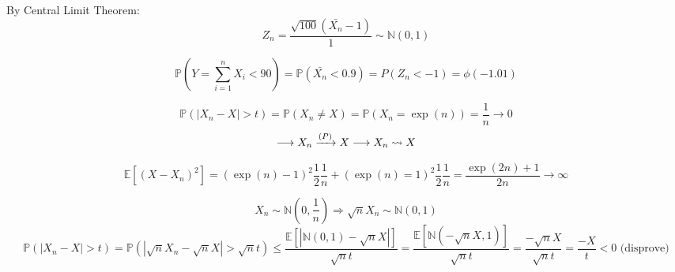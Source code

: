 \documentclass[10pt]{article}
\newenvironment{problem}[2][Problem]{\begin{trivlist}
\item[\hskip \labelsep {\bfseries #1}\hskip \labelsep {\bfseries #2.}]}{\end{trivlist}}
\begin{document}
\begin{problem}{8}



By Central Limit Theorem: 
\[Z_n=\frac{\sqrt{100}(\bar{X_n}-1)}{1} \sim \mathbb{N}(0,1)\]

\[\mathbb{P}(Y=\sum_{i=1}^{n} X_i < 90)= \mathbb{P}(\bar{X_n} < 0.9)= P(Z_n < -1)=\phi (-1.01)\]
\end{problem}




\begin{problem}{9}



\[\mathbb{P}(|X_n- X| > t)= \mathbb{P}(X_n \neq X)=\mathbb{P}(X_n=\exp(n))=\frac{1}{n} \longrightarrow 0\]
\[\longrightarrow X_n \xrightarrow[]{\text(P)} X \longrightarrow X_n \rightsquigarrow X\]

\[\mathbb{E}[(X-X_n)^2]=(\exp(n)-1)^2\frac{1}{2}\frac{1}{n}+(\exp(n)=1)^2\frac{1}{2}\frac{1}{n}= \frac{\exp(2n)+1}{2n} \rightarrow \infty \]
\end{problem}


\begin{problem}{11}



\[X_n \sim \mathbb{N}(0, \frac{1}{n}) \Rightarrow \sqrt{n}X_n \sim \mathbb{N}(0,1) \]
\[\mathbb{P}(|X_n-X| > t)=\mathbb{P}(|\sqrt{n}X_n -\sqrt{n}X| > \sqrt{n}t) \leqslant \frac{\mathbb{E}[|\mathbb{N}(0,1)-\sqrt{n}X|]}{\sqrt{n}t}= \frac{\mathbb{E}[\mathbb{N}(-\sqrt{n}X, 1)]}{\sqrt{n}t}=\frac{-\sqrt{n}X}{\sqrt{n}t}= \frac{-X}{t} < 0 \text{ (disprove)} \]
\end{problem}
\end{document}
